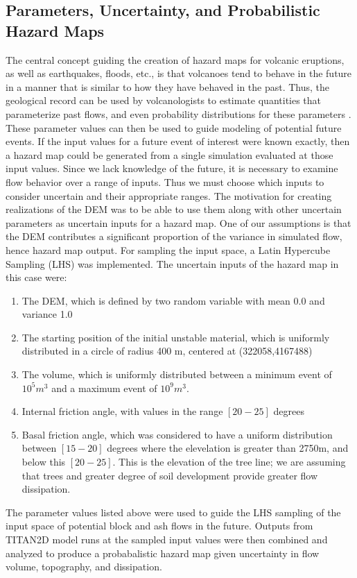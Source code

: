 \documentclass[a4paper,fleqn]{article}
\begin{document}

\subsection {Parameters, Uncertainty, and Probabilistic Hazard Maps}

The central concept guiding the creation of hazard maps for volcanic
eruptions, as well as earthquakes, floods, etc., is that volcanoes
tend to behave in the future in a manner that is similar to how they
have behaved in the past. Thus, the geological record can be used by
volcanologists to estimate quantities that parameterize past flows,
and even probability distributions for these parameters
\citep{dalbeyjgr,dalbeythesis}.  These parameter values can then be
used to guide modeling of potential future events.  If the input
values for a future event of interest were known exactly, then a
hazard map could be generated from a single simulation evaluated at
those input values. Since we lack knowledge of the future, it is
necessary to examine flow behavior over a range of inputs. Thus we
must choose which inputs to consider uncertain and their appropriate
ranges.
The motivation for creating realizations of the DEM was to be able to
use them along with other uncertain parameters as uncertain inputs for
a hazard map.  One of our assumptions is that the DEM contributes a
significant proportion of the variance in simulated flow, hence hazard
map output.  For sampling the input space, a Latin Hypercube Sampling
(LHS) was implemented.  The uncertain inputs of the hazard map in this
case were:
\begin{enumerate}
\item The DEM, which is
defined by two random variable with mean 0.0 and variance 1.0
\item The starting position of the initial unstable material, which is
uniformly distributed in a circle of radius 400 m, centered at
(322058,4167488)
\item The volume, which is uniformly distributed between a minimum
event of $10^5 m^3$ and a maximum event of $10^9 m^3$. 
\item  Internal friction angle, with values
in the range $[20 - 25]$ degrees
\item Basal friction angle, which was considered to have a uniform
distribution between $[15 - 20]$ degrees where the elevelation is
greater than 2750m, and below this $ [20 - 25]$.  This is the
elevation of the tree line; we are assuming that trees and greater
degree of soil development provide greater flow dissipation.
\end{enumerate}
The parameter values listed above were used to guide the LHS sampling
of the input space of potential block and ash flows in the future.
Outputs from TITAN2D model runs at the sampled input values were then
combined and analyzed to produce a probabalistic hazard map given
uncertainty in flow volume, topography, and dissipation.
\end{document}
